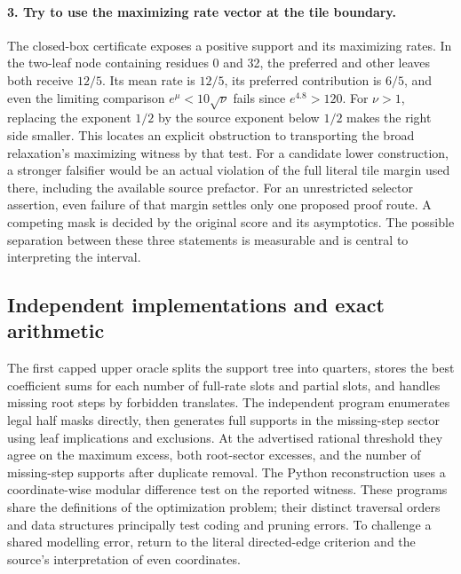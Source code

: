 \paragraph{3. Try to use the maximizing rate vector at the tile boundary.}
The closed-box certificate exposes a positive support and its maximizing rates. In the two-leaf node containing residues 0 and 32, the preferred and other leaves both receive \(12/5\). Its mean rate is \(12/5\), its preferred contribution is \(6/5\), and even the limiting comparison \(e^{\mu}<10\sqrt{\nu}\) fails since \(e^{4.8}>120\). For \(\nu>1\), replacing the exponent \(1/2\) by the source exponent below \(1/2\) makes the right side smaller. This locates an explicit obstruction to transporting the broad relaxation's maximizing witness by that test. For a candidate lower construction, a stronger falsifier would be an actual violation of the full literal tile margin used there, including the available source prefactor. For an unrestricted selector assertion, even failure of that margin settles only one proposed proof route. A competing mask is decided by the original score and its asymptotics. The possible separation between these three statements is measurable and is central to interpreting the interval.

\subsection{Independent implementations and exact arithmetic}

The first capped upper oracle splits the support tree into quarters, stores the best coefficient sums for each number of full-rate slots and partial slots, and handles missing root steps by forbidden translates. The independent program enumerates legal half masks directly, then generates full supports in the missing-step sector using leaf implications and exclusions. At the advertised rational threshold they agree on the maximum excess, both root-sector excesses, and the number of missing-step supports after duplicate removal. The Python reconstruction uses a coordinate-wise modular difference test on the reported witness. These programs share the definitions of the optimization problem; their distinct traversal orders and data structures principally test coding and pruning errors. To challenge a shared modelling error, return to the literal directed-edge criterion and the source's interpretation of even coordinates.

